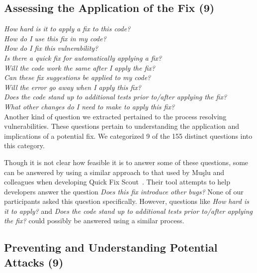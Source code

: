 \documentclass[conference]{IEEEtran}
\begin{document}

\noindent\subsection{\textbf{Assessing the Application of the Fix (9)}}

\noindent\emph{How hard is it to apply a fix to this code?} \\
\emph{How do I use this fix in my code?} \\
\emph{How do I fix this vulnerability?} \\
\emph{Is there a quick fix for automatically applying a fix?} \\
\emph{Will the code work the same after I apply the fix?} \\
\emph{Can these fix suggestions be applied to my code?} \\
\emph{Will the error go away when I apply this fix?} \\
\emph{Does the code stand up to additional tests prior to/after applying the fix?} \\
\emph{What other changes do I need to make to apply this fix?} \\

Another kind of question we extracted pertained to the process resolving vulnerabilities. These questions pertain to understanding the application and implications of a potential fix. We categorized 9 of the 155 distinct questions into this category.

Though it is not clear how feasible it is to answer some of these questions, some can be answered by using a similar approach to that used by Mu{\c{s}}lu and colleagues when developing Quick Fix Scout~\cite{mucslu2012speculative}. 
Their tool attempts to help developers answer the question \textit{Does this fix introduce other bugs?} None of our participants asked this question specifically. 
However, questions like \textit{How hard is it to apply?} and \textit{Does the code stand up to additional tests prior to/after applying the fix?} could possibly be answered using a similar process.

  

\noindent\subsection{\textbf{Preventing and Understanding Potential Attacks (9)}}
\end{document}
